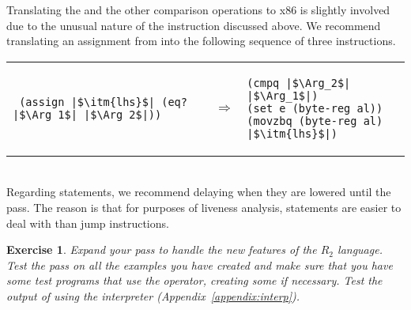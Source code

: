 \documentclass[11pt]{book}
\newtheorem{exercise}[theorem]{Exercise}
\begin{document}
Translating the  and the other comparison operations to x86
is slightly involved due to the unusual nature of the 
instruction discussed above.  We recommend translating an assignment
from  into the following sequence of three instructions. \\
\begin{tabular}{lll}
\begin{minipage}{0.4\textwidth}
\begin{lstlisting}
 (assign |$\itm{lhs}$| (eq? |$\Arg_1$| |$\Arg_2$|))
\end{lstlisting}
\end{minipage}
&
$\Rightarrow$
&
\begin{minipage}{0.4\textwidth}
\begin{lstlisting}
(cmpq |$\Arg_2$| |$\Arg_1$|)
(set e (byte-reg al))
(movzbq (byte-reg al) |$\itm{lhs}$|)
\end{lstlisting}
\end{minipage}
\end{tabular}  \\


%
%

Regarding  statements, we recommend delaying when they are
lowered until the  pass.  The reason is that
for purposes of liveness analysis,  statements are easier to
deal with than jump instructions.

\begin{exercise}\normalfont
Expand your  pass to handle the new features
of the $R_2$ language. Test the pass on all the examples you have
created and make sure that you have some test programs that use the
 operator, creating some if necessary. Test the output of
 using the  interpreter
(Appendix~\ref{appendix:interp}).
\end{exercise}
\end{document}
